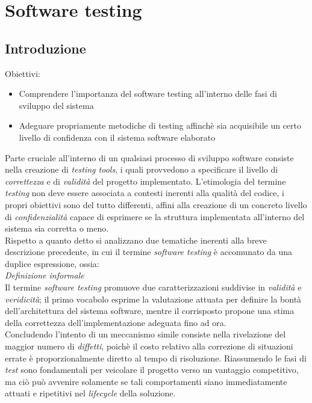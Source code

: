 \documentclass{article}
\begin{document}
\pagestyle{empty}
\section*{Software testing}
\large

\subsection*{Introduzione}
\large
Obiettivi:
\begin{itemize}
    \renewcommand{\labelitemi}{-}
    \itemsep0em
    \item Comprendere l'importanza del software testing all'interno delle fasi di sviluppo del sistema
    \item Adeguare propriamente metodiche di testing affinchè sia acquisibile un certo livello di confidenza con il sistema software elaborato
\end{itemize}
Parte cruciale all'interno di un qualsiasi processo di sviluppo software consiste nella creazione di \textit{testing tools}, i quali provvedono a specificare il livello di \textit{correttezza} e di \textit{validità} del progetto implementato. L'etimologia del termine \textit{testing} non deve essere associata a contesti inerenti alla qualità del codice, i propri obiettivi sono del tutto differenti, affini alla creazione di un concreto livello di \textit{confidenzialità} capace di esprimere se la struttura implementata all'interno del sistema sia corretta o meno.\vspace*{14pt}\\
Rispetto a quanto detto si analizzano due tematiche inerenti alla breve descrizione precedente, in cui il termine \textit{software testing} è accomunato da una duplice espressione, ossia:\vspace*{14pt}\\
\textit{Definizione informale}\\
Il termine \textit{software testing} promuove due caratterizzazioni suddivise in \textit{validità} e \textit{veridicità}; il primo vocabolo esprime la valutazione attuata per definire la bontà dell'architettura del sistema software, mentre il corrisposto propone una stima della correttezza dell'implementazione adeguata fino ad ora.\vspace*{14pt}\\
Concludendo l'intento di un meccanismo simile consiste nella rivelazione del maggior numero di \textit{diffetti}, poichè il costo relativo alla correzione di situazioni errate è proporzionalmente diretto al tempo di risoluzione. Riassumendo le fasi di \textit{test} sono fondamentali per veicolare il progetto verso un vantaggio competitivo, ma ciò può avvenire solamente se tali comportamenti siano immediatamente attuati e ripetitivi nel \textit{lifecycle} della soluzione.  
\end{document}
